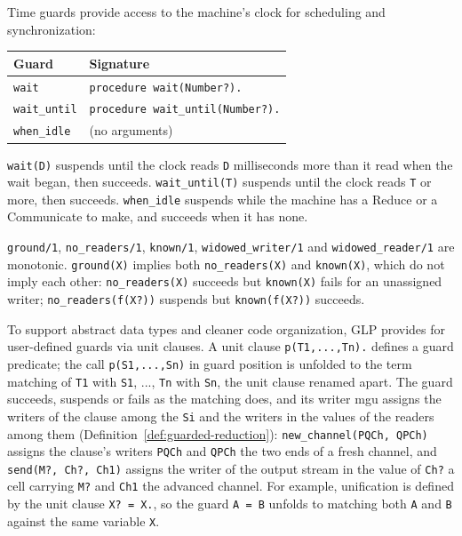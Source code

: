 Time guards provide access to the machine's clock for scheduling and synchronization:

\begin{center}
\begin{tabular}{ll}
\textbf{Guard} & \textbf{Signature} \\
\hline
\verb|wait| & \verb|procedure wait(Number?).| \\
\verb|wait_until| & \verb|procedure wait_until(Number?).| \\
\verb|when_idle| & (no arguments) \\
\end{tabular}
\end{center}
\noindent\verb|wait(D)| suspends until the clock reads \verb|D| milliseconds more than it read when the wait began, then succeeds. \verb|wait_until(T)| suspends until the clock reads \verb|T| or more, then succeeds. \verb|when_idle| suspends while the machine has a Reduce or a Communicate to make, and succeeds when it has none.

\verb|ground/1|, \verb|no_readers/1|, \verb|known/1|, \verb|widowed_writer/1| and \verb|widowed_reader/1| are monotonic. \verb|ground(X)| implies both \verb|no_readers(X)| and \verb|known(X)|, which do not imply each other: \verb|no_readers(X)| succeeds but \verb|known(X)| fails for an unassigned writer; \verb|no_readers(f(X?))| suspends but \verb|known(f(X?))| succeeds.

To support abstract data types and cleaner code organization, GLP provides for user-defined guards via unit clauses. A unit clause \verb|p(T1,...,Tn).| defines a guard predicate; the call \verb|p(S1,...,Sn)| in guard position is unfolded to the term matching of \verb|T1| with \verb|S1|, ..., \verb|Tn| with \verb|Sn|, the unit clause renamed apart. The guard succeeds, suspends or fails as the matching does, and its writer mgu assigns the writers of the clause among the \verb|Si| and the writers in the values of the readers among them (Definition~\ref{def:guarded-reduction}): \verb|new_channel(PQCh, QPCh)| assigns the clause's writers \verb|PQCh| and \verb|QPCh| the two ends of a fresh channel, and \verb|send(M?, Ch?, Ch1)| assigns the writer of the output stream in the value of \verb|Ch?| a cell carrying \verb|M?| and \verb|Ch1| the advanced channel. For example, unification is defined by the unit clause \verb|X? = X.|, so the guard \verb|A = B| unfolds to matching both \verb|A| and \verb|B| against the same variable \verb|X|.

